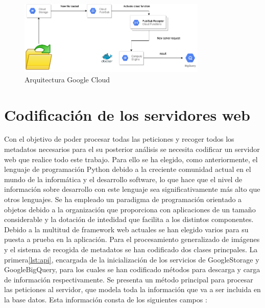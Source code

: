 \begin{figure}
    \centering
    \includegraphics[width=0.8\textwidth]{images/chapter4/cloud_architecture.png}
    \caption{Arquitectura Google Cloud}
    \label{fig:Arquitectura Google Cloud}
\end{figure}

\section{Codificación de los servidores web}\label{sec:codificación-de-los-servidores-web}
Con el objetivo de poder procesar todas las peticiones y recoger todos los metadatos necesarios para el su posterior análisis se necesita codificar un servidor web que realice todo este trabajo.
Para ello se ha elegido, como anteriormente, el lenguaje de programación Python debido a la creciente comunidad actual en el mundo de la informática y el desarrollo software, lo que hace que el nivel
de información sobre desarrollo con este lenguaje sea significativamente más alto que otros lenguajes.
Se ha empleado un paradigma de programación orientado a objetos debido a la organización que proporciona con aplicaciones de un tamaño considerable y la dotación de intedidad que facilita a los distintos
componentes.
Debido a la multitud de framework web actuales se han elegido varios para su puesta a prueba en la aplicación.
Para el procesamiento generalizado de imágenes y el sistema de recogida de metadatos se han codificado dos clases princpales.
La primera\ref{lst:api}, encargada de la inicialización de los servicios de GoogleStorage y GoogleBigQuery, para los cuales se han codificado métodos para descarga y carga de información respectivamente.
Se presenta un método principal para procesar las peticiones al servidor, que modela toda la información que va a ser incluida en la base datos.
Esta información consta de los siguientes campos :

